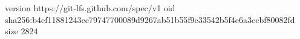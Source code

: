 version https://git-lfs.github.com/spec/v1
oid sha256:b4cf11881243cc79747700089d9267ab51b55f9e33542b5f4e6a3ccbf80082fd
size 2824
